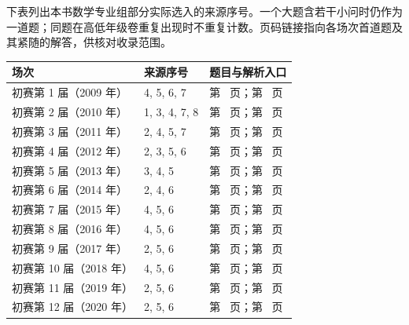 \documentclass[12pt,fontset=fandol]{ctexart}
\begin{document}
下表列出本书数学专业组部分实际选入的来源序号。一个大题含若干小问时仍作为一道题；同题在高低年级卷重复出现时不重复计数。页码链接指向各场次首道题及其紧随的解答，供核对收录范围。
\begin{longtable}{p{}p{}p{}}
\toprule 场次 & 来源序号 & 题目与解析入口\\\midrule\endhead


初赛第 1 届（2009 年） & 4, 5, 6, 7 & 第~\pageref{ex:pre01-math:4} 页；第~\pageref{ans:pre01-math:4} 页\\

初赛第 2 届（2010 年） & 1, 3, 4, 7, 8 & 第~\pageref{ex:pre02-math:1} 页；第~\pageref{ans:pre02-math:1} 页\\

初赛第 3 届（2011 年） & 2, 4, 5, 7 & 第~\pageref{ex:pre03-math:2} 页；第~\pageref{ans:pre03-math:2} 页\\

初赛第 4 届（2012 年） & 2, 3, 5, 6 & 第~\pageref{ex:pre04-math:2} 页；第~\pageref{ans:pre04-math:2} 页\\

初赛第 5 届（2013 年） & 3, 4, 5 & 第~\pageref{ex:pre05-math:3} 页；第~\pageref{ans:pre05-math:3} 页\\

初赛第 6 届（2014 年） & 2, 4, 6 & 第~\pageref{ex:pre06-math:2} 页；第~\pageref{ans:pre06-math:2} 页\\

初赛第 7 届（2015 年） & 4, 5, 6 & 第~\pageref{ex:pre07-math:4} 页；第~\pageref{ans:pre07-math:4} 页\\

初赛第 8 届（2016 年） & 4, 5, 6 & 第~\pageref{ex:pre08-math:4} 页；第~\pageref{ans:pre08-math:4} 页\\

初赛第 9 届（2017 年） & 2, 5, 6 & 第~\pageref{ex:pre09-math:2} 页；第~\pageref{ans:pre09-math:2} 页\\

初赛第 10 届（2018 年） & 4, 5, 6 & 第~\pageref{ex:pre10-math:4} 页；第~\pageref{ans:pre10-math:4} 页\\

初赛第 11 届（2019 年） & 2, 5, 6 & 第~\pageref{ex:ch10-11th-A:2} 页；第~\pageref{ans:ch10-11th-A:2} 页\\

初赛第 12 届（2020 年） & 2, 5, 6 & 第~\pageref{ex:ch09-12th-A:2} 页；第~\pageref{ans:ch09-12th-A:2} 页\\


\end{longtable}
\end{document}
